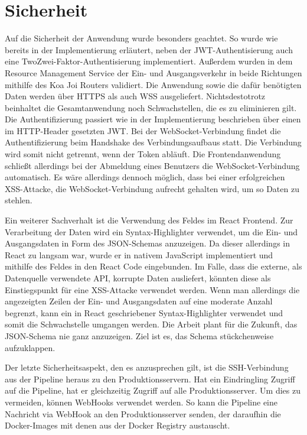 \section{Sicherheit}
\label{sec:sicherheit}
Auf die Sicherheit der Anwendung wurde besonders geachtet. So wurde wie bereits in der Implementierung erläutert, neben
der JWT-Authentisierung auch eine TwoZwei-Faktor-Authentisierung implementiert. Außerdem wurden in dem Resource Management Service
der Ein- und Ausgangsverkehr in beide Richtungen mithilfe des Koa Joi Routers validiert. Die Anwendung sowie die dafür benötigten
Daten werden über HTTPS als auch WSS ausgeliefert. Nichtsdestotrotz beinhaltet die Gesamtanwendung
noch Schwachstellen, die es zu eliminieren gilt. Die Authentifizierung passiert wie in der Implementierung beschrieben
über einen im HTTP-Header gesetzten JWT. Bei der WebSocket-Verbindung findet die Authentifizierung beim Handshake des
Verbindungsaufbaus statt. Die Verbindung wird somit nicht getrennt, wenn der Token abläuft. Die Frontendanwendung
schließt allerdings bei der Abmeldung eines Benutzers die WebSocket-Verbindung automatisch. Es wäre allerdings dennoch möglich,
dass bei einer erfolgreichen XSS-Attacke, die WebSocket-Verbindung aufrecht gehalten wird, um so Daten zu stehlen.

Ein weiterer Sachverhalt ist die Verwendung des  Feldes im React Frontend. Zur Verarbeitung
der Daten wird ein Syntax-Highlighter verwendet, um die Ein- und Ausgangsdaten in Form des JSON-Schemas anzuzeigen.
Da dieser allerdings in React zu langsam war, wurde er in nativem JavaScript implementiert und mithilfe des 
 Feldes in den React Code eingebunden. Im Falle, dass die externe, als Datenquelle
verwendete API, korrupte Daten ausliefert, könnten diese als Einstiegspunkt für eine XSS-Attacke verwendet werden.
Wenn man allerdings die angezeigten Zeilen der Ein- und Ausgangsdaten auf eine moderate Anzahl begrenzt, kann ein
in React geschriebener Syntax-Highlighter verwendet und somit die Schwachstelle umgangen werden. Die Arbeit plant
für die Zukunft, das JSON-Schema nie ganz anzuzeigen. Ziel ist es, das Schema stückchenweise aufzuklappen.

Der letzte Sicherheitsaspekt, den es anzusprechen gilt, ist die SSH-Verbindung aus der Pipeline heraus zu den Produktionsservern.
Hat ein Eindringling Zugriff auf die Pipeline, hat er gleichzeitig Zugriff auf alle Produktionsserver. 
Um dies zu vermeiden, können WebHooks verwendet werden. So kann die Pipeline eine Nachricht via WebHook an
den Produktionsserver senden, der daraufhin die Docker-Images mit denen aus der Docker Registry austauscht.

